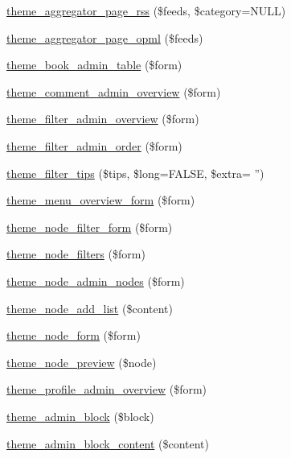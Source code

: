 \begin{CompactItemize}
\item 
\hyperlink{group__themeable_g5a282bbb141cbf28b7aee12b14a74bf5}{theme\_\-aggregator\_\-page\_\-rss} (\$feeds, \$category=NULL)
\item 
\hyperlink{group__themeable_gbafd2e326445cab10147eacd65c1c023}{theme\_\-aggregator\_\-page\_\-opml} (\$feeds)
\item 
\hyperlink{group__themeable_g250393c4077bcc35d19c833dcdc999d4}{theme\_\-book\_\-admin\_\-table} (\$form)
\item 
\hyperlink{group__themeable_g206b5909bfdb91cc12f8f10edadbf45d}{theme\_\-comment\_\-admin\_\-overview} (\$form)
\item 
\hyperlink{group__themeable_gb75dc6c3bff3b14c9d8decc0bdf65cf1}{theme\_\-filter\_\-admin\_\-overview} (\$form)
\item 
\hyperlink{group__themeable_g2043f70c09f1b97fed7917c783bb774c}{theme\_\-filter\_\-admin\_\-order} (\$form)
\item 
\hyperlink{group__themeable_gfaa023779cae01b4864c8bbec37ab6ff}{theme\_\-filter\_\-tips} (\$tips, \$long=FALSE, \$extra= '')
\item 
\hyperlink{group__themeable_g4af0d13e1a7fdd7c08283101bbed6d2c}{theme\_\-menu\_\-overview\_\-form} (\$form)
\item 
\hyperlink{group__themeable_gacf4ca3e12603e4d519b6313276e761e}{theme\_\-node\_\-filter\_\-form} (\$form)
\item 
\hyperlink{group__themeable_g8c9a4c2c680b412160c95515eb9b4c7b}{theme\_\-node\_\-filters} (\$form)
\item 
\hyperlink{group__themeable_g2601e8db30df61b351801e91a3de55b6}{theme\_\-node\_\-admin\_\-nodes} (\$form)
\item 
\hyperlink{group__themeable_g8eb0074d64a1c80291b651316f9b0659}{theme\_\-node\_\-add\_\-list} (\$content)
\item 
\hyperlink{group__themeable_g446a4c85c20acb7a6447d0acbe0d0210}{theme\_\-node\_\-form} (\$form)
\item 
\hyperlink{group__themeable_gfd0ecfb60057deb25b781a272a45a3a7}{theme\_\-node\_\-preview} (\$node)
\item 
\hyperlink{group__themeable_g66e427cb630bfec91b54a2f686d68aa4}{theme\_\-profile\_\-admin\_\-overview} (\$form)
\item 
\hyperlink{group__themeable_gae7aed78086b8469fa3e21a6dbacbbde}{theme\_\-admin\_\-block} (\$block)
\item 
\hyperlink{group__themeable_g520c47bce2ec30cc6c834e625a28e169}{theme\_\-admin\_\-block\_\-content} (\$content)

\end{CompactItemize}
